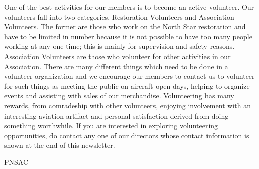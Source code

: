 One of the best activities for our members is to become an active volunteer. Our volunteers fall into two categories, Restoration Volunteers and Association Volunteers. The former are those who work on the North Star restoration and have to be limited in number because it is not possible to have too many people working at any one time; this is mainly for supervision and safety reasons. Association Volunteers are those who volunteer for other activities in our Association. There are many different things which need to be done in a volunteer organization and we encourage our members to contact us to volunteer for such things as meeting the public on aircraft open days, helping to organize events and assisting with sales of our merchandise. Volunteering has many rewards, from comradeship with other volunteers, enjoying involvement with an interesting aviation artifact and personal satisfaction derived from doing something worthwhile. If you are interested in exploring volunteering opportunities, do contact any one of our directors whose contact information is shown at the end of this newsletter. 


\begin{footnotesize}
    \raggedleft PNSAC\\
\end{footnotesize}



